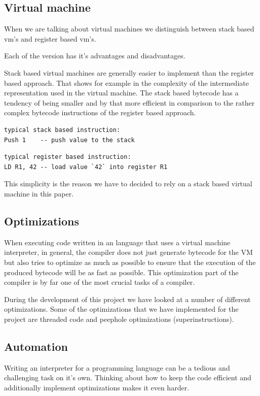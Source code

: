 \documentclass{article}
\begin{document}
\subsection{Virtual machine}
When we are talking about virtual machines we distinguish between stack based vm's and 
register based vm's.

Each of the version has it's advantages and disadvantages.

Stack based virtual machines are generally easier to implement than the register based approach.
That shows for example in the complexity of the intermediate representation used in the virtual 
machine. The stack based bytecode has a tendency of being smaller and by that more efficient in 
comparison to the rather complex bytecode instructions of the register based approach.

\begin{verbatim}
typical stack based instruction:
Push 1    -- push value to the stack
\end{verbatim}

\begin{verbatim}
typical register based instruction:
LD R1, 42 -- load value `42` into register R1
\end{verbatim}

This simplicity is the reason we have to decided to rely on a stack based virtual machine in
this paper.

\subsection{Optimizations}
When executing code written in an language that uses a virtual machine
interpreter, in general, the compiler does not just generate bytecode for the
VM but also tries to optimize as much as possible to ensure that the execution
of the produced bytecode will be as fast as possible. 
This optimization part of the compiler is by far one of the most crucial tasks
of a compiler.

During the development of this project we have looked at a number of different
optimizations. Some of the optimizations that we have implemented for the
project are threaded code and peephole optimizations (superinstructions).

\subsection{Automation}
Writing an interpreter for a programming language can be a tedious and
challenging task on it's own. Thinking about how to keep the code efficient and
additionally implement optimizations makes it even harder.
\end{document}
